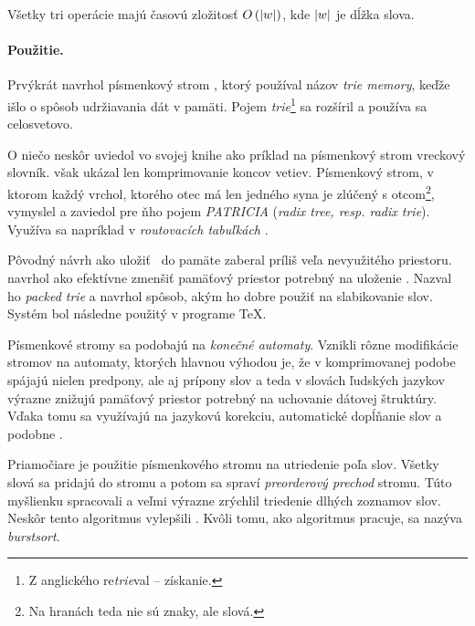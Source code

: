 \bigskip
Všetky tri operácie majú časovú 
zložitosť $O\left( |w|\right)$, kde $|w|$ je dĺžka slova.

\paragraph{Použitie.}
Prvýkrát navrhol písmenkový strom \citet{fredkin}, ktorý používal názov 
\emph{trie memory}, keďže išlo o spôsob udržiavania dát v pamäti. Pojem 
\emph{trie}\footnote{Z anglického re\emph{trie}val -- získanie.} 
sa rozšíril a používa sa celosvetovo.

O niečo neskôr \citet{knuth} uviedol vo svojej knihe ako príklad na 
písmenkový strom vreckový slovník. 
\citet{knuth} však ukázal len komprimovanie koncov vetiev. Písmenkový 
strom, v ktorom každý vrchol, ktorého otec má len jedného syna 
je zlúčený s otcom\footnote{Na hranách teda nie sú znaky, ale slová.}, 
vymyslel \citet{patricia} a zaviedol pre ňho pojem \emph{PATRICIA} 
(\emph{radix tree, resp. radix trie}). Využíva sa napríklad v 
\emph{routovacích tabuľkách} \citep{radix}.

Pôvodný návrh \citep{fredkin} ako uložiť \trie\ do pamäte zaberal príliš 
veľa nevyužitého priestoru. \citet{liang} navrhol ako efektívne zmenšiť 
pamäťový priestor potrebný na uloženie \trie. Nazval ho \emph{packed trie} 
a navrhol spôsob, akým ho dobre použiť na slabikovanie slov. Systém bol 
následne použitý v programe \TeX. 

Písmenkové stromy sa podobajú na \emph{konečné automaty}. 
Vznikli rôzne modifikácie stromov na automaty, ktorých hlavnou výhodou je, 
že v komprimovanej podobe spájajú nielen predpony, ale aj prípony slov 
a teda v slovách ľudských jazykov výrazne znižujú pamäťový priestor potrebný 
na uchovanie dátovej štruktúry. Vďaka tomu sa využívajú na jazykovú korekciu, 
automatické dopĺňanie slov a podobne \citep{scrabble,ca}. 

Priamočiare je použitie písmenkového stromu na utriedenie poľa slov. 
Všetky slová sa pridajú do stromu a potom sa spraví \emph{preorderový prechod} 
stromu. Túto myšlienku spracovali \citet{burstsort1} a veľmi výrazne zrýchlil 
triedenie dlhých zoznamov slov. Neskôr tento algoritmus vylepšili 
\citet{burstsort2}. Kvôli tomu, ako algoritmus pracuje, 
sa nazýva \emph{burstsort}.

